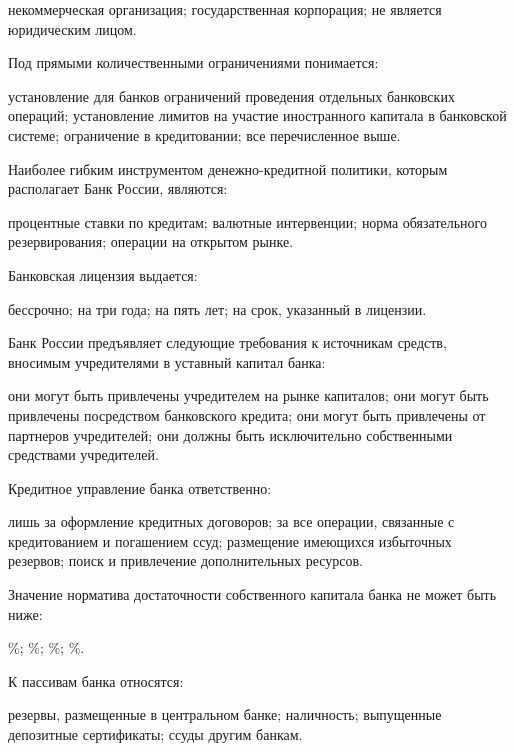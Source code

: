 \documentclass[12pt, table]{exam}
\begin{document}
\begin{questions}
\begin{multicols}{2}
\begin{choices}
	 \CC некоммерческая организация;
	 \choice государственная корпорация;
	 \choice не является юридическим лицом.
	 \end{choices}
\question Под прямыми количественными ограничениями понимается:
	 \begin{choices}
	 \choice установление для банков ограничений проведения отдельных банковских операций;
	 \choice установление лимитов на участие иностранного капитала в банковской системе;
	 \choice ограничение в кредитовании;
	 \CC все перечисленное выше.
	 \end{choices}
\question Наиболее гибким инструментом денежно-кредитной политики, которым располагает Банк России, являются:
	 \begin{choices}
	 \CC процентные ставки по кредитам;
	 \choice валютные интервенции;
	 \choice норма обязательного резервирования;
	 \choice операции на открытом рынке.
	 \end{choices}
\question Банковская лицензия выдается:
	 \begin{choices}
	 \CC бессрочно;
	 \choice на три года;
	 \choice на пять лет;
	 \choice на срок, указанный в лицензии.
	 \end{choices}
\question Банк России предъявляет следующие требования к источникам средств, вносимым учредителями в уставный капитал банка:
	 \begin{choices}
	 \choice они могут быть привлечены учредителем на рынке капиталов;
	 \choice они могут быть привлечены посредством банковского кредита;
	 \choice они могут быть привлечены от партнеров учредителей;
	 \CC они должны быть исключительно собственными средствами учредителей.
	 \end{choices}
\question Кредитное управление банка ответственно:
	 \begin{choices}
	 \choice лишь за оформление кредитных договоров;
	 \CC за все операции, связанные с кредитованием и погашением ссуд;
	 \choice размещение имеющихся избыточных резервов;
	 \choice поиск и привлечение дополнительных ресурсов.
	 \end{choices}
\question Значение норматива достаточности собственного капитала банка не может быть ниже:
	 \begin{choices}
	 \%;
	 \%;
	 \%;
	 \%.
	 \end{choices}
\question К пассивам банка относятся:
	 \begin{choices}
	 \choice резервы, размещенные в центральном банке;
	 \choice наличность;
	 \CC выпущенные депозитные сертификаты;
	 \choice ссуды другим банкам.

\end{choices}
\end{multicols}
\end{questions}
\end{document}
